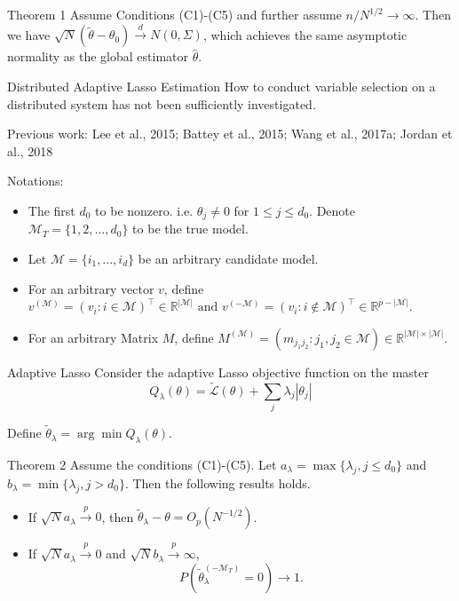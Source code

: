 \documentclass[11pt]{beamer}
\begin{document}
\begin{frame}{Theorem 1}
Assume Conditions (C1)-(C5) and further assume $n/N^{1/2}\to \infty$. Then we have $\sqrt{N}(\tilde{\theta}-\theta_0)\stackrel{d}{\to} N(0,\Sigma)$, which
achieves the same asymptotic normality as the global estimator $\hat{\theta}$.
\end{frame}

\begin{frame}{Distributed Adaptive Lasso Estimation}
How to conduct variable selection on a distributed system has not been sufficiently investigated.

{\color{blue} Previous work: Lee et al., 2015; Battey et al., 2015; Wang et al., 2017a;
Jordan et al., 2018}
\vspace{3ex}

Notations:
\begin{itemize}
\item The first $d_0$ to be nonzero. i.e. $\theta_j\ne 0$ for $1\le j \le d_0$. Denote $\mathcal{M}_T=\{1,2,\ldots,d_0\} $ to be the true model.
\item Let $\mathcal{M}=\{i_1,\ldots,i_d\}$ be an  arbitrary candidate model.
\item For an arbitrary vector $v$, define $v^{(\mathcal{M})}=\left(v_{i}: i \in \mathcal{M}\right)^{\top} \in \mathbb{R}^{|\mathcal{M}|} \text { and } v^{(-\mathcal{M})}=\left(v_{i}: i \notin \mathcal{M}\right)^{\top} \in \mathbb{R}^{p-|\mathcal{M}|}$.
\item  For an arbitrary Matrix $M$, define $M^{(\mathcal{M})}=\left(m_{j_{1} j_{2}}: j_{1}, j_{2} \in \mathcal{M}\right) \in \mathbb{R}^{|\mathcal{M}| \times|\mathcal{M}|}$.
\end{itemize}
\end{frame}

\begin{frame}{Adaptive Lasso}
Consider the adaptive Lasso objective function on the master
$$
Q_{\lambda}(\theta)=\widetilde{\mathcal{L}}(\theta)+\sum_{j} \lambda_{j}\left|\theta_{j}\right|
$$

Define $\tilde{\theta}_{\lambda}=\arg\min Q_{\lambda}(\theta)$. 
\end{frame}

\begin{frame}{Theorem 2}
Assume the conditions (C1)-(C5). Let $a_{\lambda}=\max\{\lambda_j, j\le d_0\}$ and $b_{\lambda}=\min\{\lambda_j, j>d_0\}$. Then the following results holds.
\begin{itemize}
\item If $\sqrt{N}a_{\lambda}\stackrel{p}{\to} 0$, then
$\tilde{\theta}_{\lambda}-\theta=O_p(N^{-1/2})$.
\item If $\sqrt{N}a_{\lambda}\stackrel{p}{\to} 0$ and $\sqrt{N}b_{\lambda} \stackrel{p}{\to} \infty$,
$$
P\left(\widetilde{\theta}_{\lambda}^{\left(-\mathcal{M}_{T}\right)}=0\right) \rightarrow 1.
$$
\end{itemize}
\end{frame}
\end{document}

